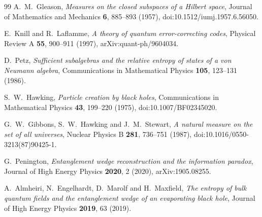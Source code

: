 \documentclass[11pt]{article}
\begin{document}
\begin{thebibliography}{99}
A.~M.~Gleason, \emph{Measures on the closed subspaces of a Hilbert space},
Journal of Mathematics and Mechanics \textbf{6}, 885--893 (1957),
doi:10.1512/iumj.1957.6.56050.

E.~Knill and R.~Laflamme, \emph{A theory of quantum error-correcting codes},
Physical Review A \textbf{55}, 900--911 (1997), arXiv:quant-ph/9604034.

D.~Petz, \emph{Sufficient subalgebras and the relative entropy of states of a
von Neumann algebra}, Communications in Mathematical Physics \textbf{105},
123--131 (1986).

S.~W.~Hawking, \emph{Particle creation by black holes}, Communications in
Mathematical Physics \textbf{43}, 199--220 (1975),
doi:10.1007/BF02345020.

G.~W.~Gibbons, S.~W.~Hawking and J.~M.~Stewart,
\emph{A natural measure on the set of all universes}, Nuclear Physics B
\textbf{281}, 736--751 (1987), doi:10.1016/0550-3213(87)90425-1.

G.~Penington, \emph{Entanglement wedge reconstruction and the information paradox},
Journal of High Energy Physics \textbf{2020}, 2 (2020),
arXiv:1905.08255.

A.~Almheiri, N.~Engelhardt, D.~Marolf and H.~Maxfield,
\emph{The entropy of bulk quantum fields and the entanglement wedge of an
evaporating black hole}, Journal of High Energy Physics \textbf{2019}, 63 (2019).
\end{thebibliography}
\end{document}
